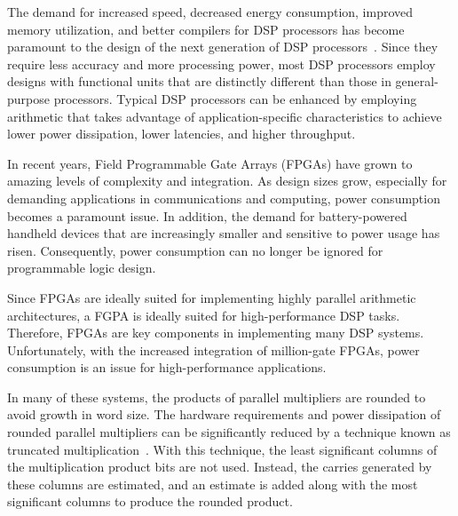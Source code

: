 
The demand for increased speed, decreased
energy consumption, improved memory utilization, and better compilers
for DSP processors has become paramount to the design of the next
generation of DSP processors~\cite{saghir}. 
Since they require less accuracy and more processing power, 
most DSP processors employ designs with 
functional units that are distinctly different
than those in general-purpose processors.  Typical DSP processors can
be enhanced by employing arithmetic that takes advantage of
application-specific characteristics to achieve lower 
power dissipation, lower latencies, and higher throughput.  

In recent years, Field Programmable Gate Arrays (FPGAs) have grown to amazing
levels of complexity and integration.  As design sizes grow, especially for
demanding applications in communications and computing, power consumption
becomes a paramount issue.  In addition, the demand for battery-powered
handheld devices that are increasingly smaller and sensitive to power usage has
risen.  Consequently, power consumption can no longer be ignored for
programmable logic design.  

Since FPGAs are ideally suited for implementing
highly parallel arithmetic architectures, a FGPA is ideally suited for
high-performance DSP tasks.  
Therefore, FPGAs are key components in implementing 
many DSP systems.  
Unfortunately, 
with the increased integration of million-gate FPGAs, power consumption
is an issue for high-performance applications.  

In many of these
systems, the products of parallel multipliers are rounded to avoid 
growth in word size. The hardware requirements and power dissipation
of rounded parallel multipliers can be significantly reduced by 
a technique known as truncated 
multiplication~\cite{lim}. 
With this technique, the 
least significant columns of the multiplication product bits are not used.
Instead, the carries generated by these columns are estimated, and an
estimate is added along with the most significant columns to produce the
rounded product. 

